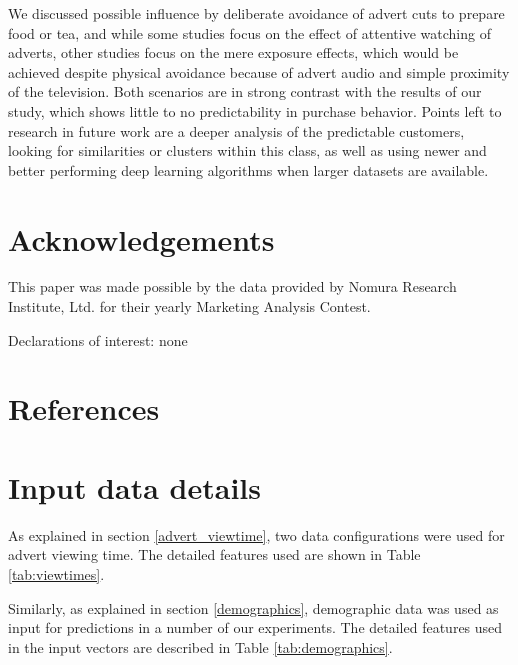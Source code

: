 \documentclass[review]{elsarticle}
\begin{document}
We discussed possible influence by deliberate avoidance of advert cuts to prepare food or tea, and while some studies focus on the effect of attentive watching of adverts, other studies focus on the mere exposure effects, which would be achieved despite physical avoidance because of advert audio and simple proximity of the television. Both scenarios are in strong contrast with the results of our study, which shows little to no predictability in purchase behavior. Points left to research in future work are a deeper analysis of the predictable customers, looking for similarities or clusters within this class, as well as using newer and better performing deep learning algorithms when larger datasets are available. 

\section{Acknowledgements}

This paper was made possible by the data provided by Nomura Research Institute, Ltd. for their yearly Marketing Analysis Contest.

Declarations of interest: none

\section*{References}



\clearpage
\appendix
\appendixpage

\section{Input data details}
\label{appendix:inputs}

As explained in section \ref{advert_viewtime}, two data configurations were used for advert viewing time. The detailed features used are shown in Table \ref{tab:viewtimes}. 

Similarly, as explained in section \ref{demographics}, demographic data was used as input for predictions in a number of our experiments. The detailed features used in the input vectors are described in Table \ref{tab:demographics}.
\end{document}
